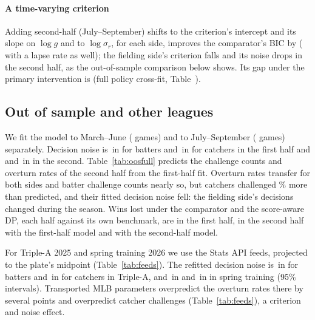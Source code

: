 \documentclass[aoas]{imsart}
\theoremstyle{plain}
\theoremstyle{definition}
\begin{document}
\paragraph{A time-varying criterion} Adding second-half (July--September) shifts to the criterion's intercept and its
slope on $\log g$ and to $\log\sigma_r$, for each side, improves the comparator's BIC by \TimeDBICnum{} (\TimeDBICLapse{}
with a lapse rate as well); the fielding side's criterion falls and its noise drops in the second half, as the
out-of-sample comparison below shows. Its gap under the primary intervention is \GapTime{} (full policy cross-fit,
Table~).

\subsection{Out of sample and other leagues}\label{sec:oos}
We fit the model to March--June (\SOOSTrainGames{} games) and to July--September (\SOOSTestGames{} games) separately.
Decision noise is \SOOSTrainSrBatter\,in for batters and \SOOSTrainSrCatcher\,in for catchers in the first half and
\SOOSTestSrBatter{} and \SOOSTestSrCatcher\,in in the second. Table~\ref{tab:oosfull} predicts the challenge counts and
overturn rates of the second half from the first-half fit. Overturn rates transfer for both sides and batter challenge
counts nearly so, but catchers challenged \OOSCatcherExcess\% more than predicted, and their fitted decision noise
fell: the fielding side's decisions changed during the season. Wins lost under the comparator and the score-aware DP,
each half against its own benchmark, are \SOOSLostTrainTrain{} in the first half, \SOOSLostTestTrain{} in the second
half with the first-half model and \SOOSLostTestTest{} with the second-half model.

For Triple-A 2025 and spring training 2026 we use the Stats API feeds, projected to the plate's midpoint
(Table~\ref{tab:feeds}). The refitted decision noise is \AAASrBatter\,in \SAAASrBatterCI{} for batters and
\AAASrCatcher\,in \SAAASrCatcherCI{} for catchers in Triple-A, and \SpringSrBatter\,in \SSpringSrBatterCI{} and
\SpringSrCatcher\,in \SSpringSrCatcherCI{} in spring training (95\% intervals). Transported MLB parameters overpredict the overturn rates there by several points and overpredict catcher
challenges (Table~\ref{tab:feeds}), a criterion and noise effect.

\begin{table}[!htbp]
\caption{Observed against predicted challenges and overturn rates (observed / predicted). ``Fit'': the sample the
parameters are estimated on.}\label{tab:oosfull}
\centering\small
\resizebox{\textwidth}{!}{}
\end{table}
\end{document}
